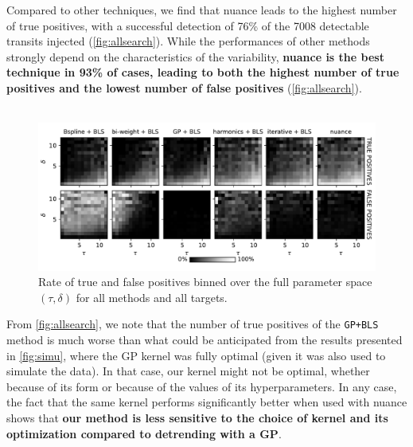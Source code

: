 \documentclass[modern,linenumbers]{aastex631}
\newcommand{\nuancecode}{\textsf{nuance}}
\begin{document}
Compared to other techniques, we find that \nuancecode{} leads to the highest number of true positives, with a successful detection of 76\% of the 7008 detectable transits injected (\autoref{fig:allsearch}). While the performances of other methods strongly depend on the characteristics of the variability, \textbf{\nuancecode{} is the best technique in 93\% of cases, leading to both the highest number of true positives and the lowest number of false positives} (\autoref{fig:allsearch}).\\\\
\begin{figure}[H]
    \begin{centering}
        \includegraphics[width=\linewidth]{../workflows/tess_injection_recovery/figures/tpfp_ims.pdf}
        \caption{Rate of true and false positives binned over the full parameter space $(\tau, \delta)$ for all methods and all targets.}
        \label{fig:allsearchim}
    \end{centering}
\end{figure}
From \autoref{fig:allsearch}, we note that the number of true positives of the \texttt{GP+BLS} method is much worse than what could be anticipated from the results presented in \autoref{fig:simu}, where the GP kernel was fully optimal (given it was also used to simulate the data). In that case, our kernel might not be optimal, whether because of its form or because of the values of its hyperparameters. In any case, the fact that the same kernel performs significantly better when used with \nuancecode{} shows that \textbf{our method is less sensitive to the choice of kernel and its optimization compared to detrending with a GP}.\\\\
\end{document}
